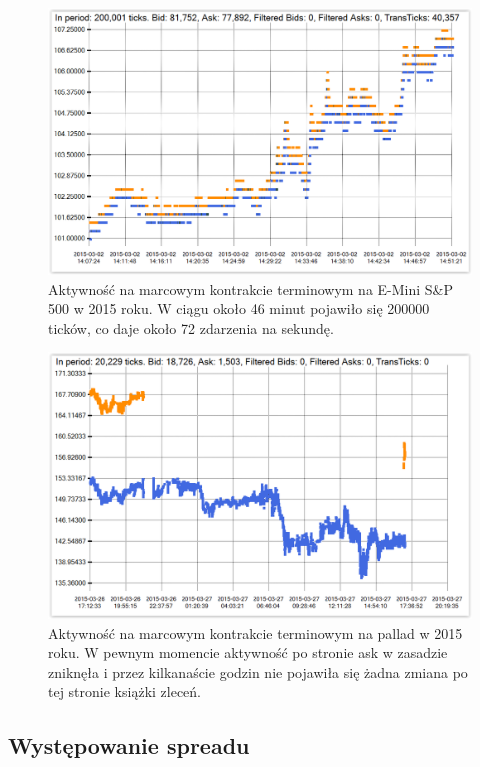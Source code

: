 \documentclass[a4paper,12pt,openany, DIV=calc, headsepline]{scrbook}
\begin{document}
\begin{figure}[H]
  \centering
  \includegraphics[scale=0.5]{wykresy/fESH.PNG}
  \caption{Aktywność na marcowym kontrakcie terminowym na E-Mini S\&P 500 w 2015 roku. W ciągu około 46 minut pojawiło się 200000 ticków, co daje około 72 zdarzenia na sekundę.}
  \label{fig:spticks}
\end{figure}

\begin{figure}[H]
  \centering
  \includegraphics[scale=0.5]{wykresy/fplh15.PNG}
  \caption{Aktywność na marcowym kontrakcie terminowym na pallad w 2015 roku. W pewnym momencie aktywność po stronie ask w zasadzie zniknęła i przez kilkanaście godzin nie pojawiła się żadna zmiana po tej stronie książki zleceń.}
  \label{fig:fplh15}
\end{figure}

\subsection{Występowanie spreadu}
\end{document}
